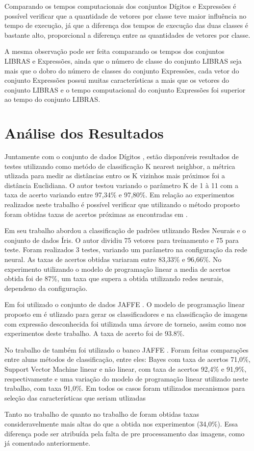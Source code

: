 Comparando os tempos computacionais dos conjuntos Dígitos e Expressões é possível verificar que a quantidade de vetores por classe teve maior influência no tempo de execução, já que a diferença dos tempos de execução das duas classes é bastante alto, proporcional a diferença entre as quantidades de vetores por classe. 

A mesma observação pode ser feita comparando os tempos dos conjuntos LIBRAS e Expressões, ainda que o número de classe do conjunto LIBRAS seja mais que o dobro do número de classes do conjunto Expressões, cada vetor do conjunto Expressões possui muitas características a mais que os vetores do conjunto LIBRAS e o tempo computacional do conjunto Expressões foi superior ao tempo do conjunto LIBRAS.

\section{Análise dos Resultados}

Juntamente com o conjunto de dados Dígitos \cite{Digitos}, estão disponíveis resultados de testes utilizando como metódo de classificação K nearest neighbor, a métrica utlizada para medir as distâncias entro os K vizinhos mais próximos foi a distância Euclidiana. O autor testou variando o parâmetro K de 1 à 11 com a taxa de acerto variando entre 97,34\% e 97,80\%. Em relação ao experimentos realizados neste trabalho é possível verificar que utilizando o método proposto foram obtidas taxas de acertos próximas as encontradas em .

Em seu trabalho  abordou a classificação de padrões utlizando Redes Neurais e o conjunto de dados Íris. O autor dividiu 75 vetores para treinamento e 75 para teste. Foram realizados 3 testes, variando um parâmetro na configuração da rede neural. As taxas de acertos obtidas variaram entre 83,33\% e 96,66\%. No experimento utilizando o modelo de programação linear a media de acertos obtida foi de 87\%, um taxa que supera a obtida utilizando redes neurais, dependeno da configuração.

Em  foi utilizado o conjunto de dados JAFFE \cite{Jaffe}. O modelo de programação linear proposto em  é utlizado para gerar os classificadores e na classificação de imagens com expressão desconhecida foi utilizada uma árvore de torneio, assim como nos experimentos deste trabalho. A taxa de acerto foi de 93.8\%.

No trabalho de  também foi utilizado o banco JAFFE \cite{Jaffe}. Foram feitas comparações entre aluns métodos de classificação, entre eles: Bayes com taxa de acertos 71,0\%, Support Vector Machine linear e não linear, com taxa de acertos 92,4\% e 91,9\%, respectivamente e uma variação do modelo de programação linear utilizado neste trabalho, com taxa 91,0\%. Em todos os casos foram utilizados mecanismos para seleção das características que seriam utlizadas
 
Tanto no trabalho de  quanto no trabalho de  foram obtidas taxas consideravelmente mais altas do que a obtida nos experimentos (34,0\%). Essa diferença pode ser atribuída pela falta de pre processamento das imagens, como já comentado anteriormente.

